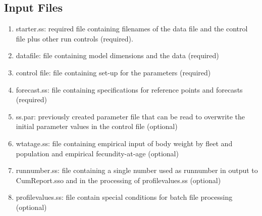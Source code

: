 	\subsection{Input Files}
	\begin{enumerate}
		\item starter.ss: required file containing filenames of the data file and the control file plus other run controls (required).
		\item datafile: file containing model dimensions and the data (required)
		\item control file: file containing set-up for the parameters (required)
		\item forecast.ss: file containing specifications for reference points and forecasts (required) 
		\item ss.par: previously created parameter file that can be read to overwrite the initial parameter values in the control file (optional)
		\item wtatage.ss: file containing empirical input of body weight by fleet and population and empirical fecundity-at-age (optional)
		\item runnumber.ss: file containing a single number used as runnumber in output to CumReport.sso and in the processing of profilevalues.ss (optional)
		\item profilevalues.ss: file contain special conditions for batch file processing (optional)
	\end{enumerate}
	
